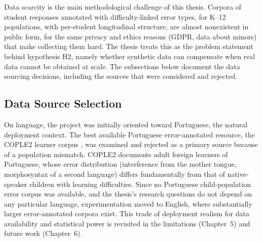 Data scarcity is the main methodological challenge of this thesis. Corpora of student responses annotated with difficulty-linked error types, for K--12 populations, with per-student longitudinal structure, are almost nonexistent in public form, for the same privacy and ethics reasons (GDPR, data about minors) that make collecting them hard. The thesis treats this as the problem statement behind hypothesis H2, namely whether synthetic data can compensate when real data cannot be obtained at scale. The subsections below document the data sourcing decisions, including the sources that were considered and rejected.

\subsection{Data Source Selection}
\label{sec:method_data_sources}

On language, the project was initially oriented toward Portuguese, the natural deployment context. The best available Portuguese error-annotated resource, the COPLE2 learner corpus \parencite{Mendes2016}, was examined and rejected as a primary source because of a population mismatch. COPLE2 documents adult foreign learners of Portuguese, whose error distribution (interference from the mother tongue, morphosyntax of a second language) differs fundamentally from that of native-speaker children with learning difficulties. Since no Portuguese child-population error corpus was available, and the thesis's research questions do not depend on any particular language, experimentation moved to English, where substantially larger error-annotated corpora exist. This trade of deployment realism for data availability and statistical power is revisited in the limitations (Chapter~5) and future work (Chapter~6).

